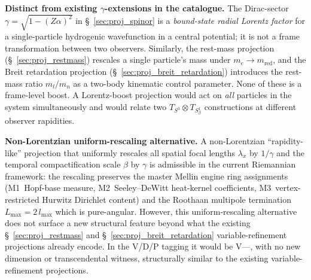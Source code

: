 \documentclass[11pt]{article}
\begin{document}
\begin{enumerate}
\textbf{Distinct from existing $\gamma$-extensions in the
catalogue.}  The Dirac-sector $\gamma = \sqrt{1 - (Z\alpha)^2}$ in
\S~\ref{sec:proj_spinor} is a \emph{bound-state radial Lorentz
factor} for a single-particle hydrogenic wavefunction in a central
potential; it is not a frame transformation between two observers.
Similarly, the rest-mass projection
(\S~\ref{sec:proj_restmass}) rescales a single particle's mass under
$m_e \to m_\text{red}$, and the Breit retardation projection
(\S~\ref{sec:proj_breit_retardation}) introduces the rest-mass
ratio $m_l/m_n$ as a two-body kinematic control parameter.  None of
these is a frame-level boost.  A Lorentz-boost projection would act
on \emph{all} particles in the system simultaneously and would
relate two $T_{S^3} \otimes T_{S^1_\beta}$ constructions at
different observer rapidities.

\textbf{Non-Lorentzian uniform-rescaling alternative.}  A
non-Lorentzian ``rapidity-like'' projection that uniformly rescales
all spatial focal lengths $\lambda_x$ by $1/\gamma$ and the
temporal compactification scale $\beta$ by $\gamma$ is admissible
in the current Riemannian framework: the rescaling preserves the
master Mellin engine ring assignments
(M1~Hopf-base measure, M2~Seeley--DeWitt heat-kernel coefficients,
M3~vertex-restricted Hurwitz Dirichlet content) and the Roothaan
multipole termination $L_\text{max} = 2\,l_\text{max}$ which is
pure-angular.  However, this uniform-rescaling alternative does
not surface a new structural feature beyond what the existing
\S~\ref{sec:proj_restmass} and \S~\ref{sec:proj_breit_retardation}
variable-refinement projections already encode.  In the V/D/P
tagging it would be V---, with no new dimension or transcendental
witness, structurally similar to the existing variable-refinement
projections.


\end{enumerate}
\end{document}
